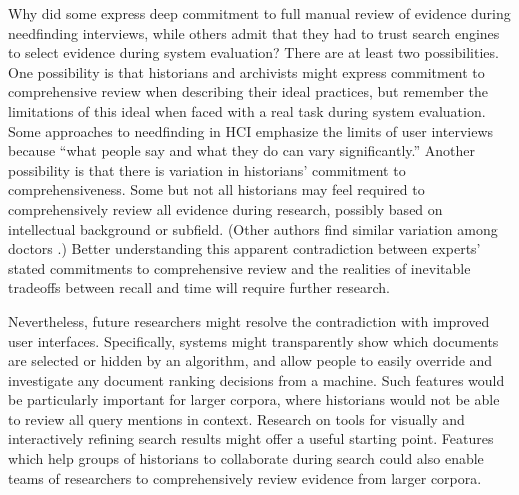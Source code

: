 Why did some express deep commitment to full manual review of evidence during needfinding interviews, while others admit that they had to trust search engines to select evidence during system evaluation? 
There are at least two possibilities. 
One possibility is that historians and archivists might express commitment to comprehensive review when describing their ideal practices, but remember the limitations of this ideal when faced with a real task during system evaluation.
Some approaches to needfinding in HCI emphasize the limits of user interviews \cite{ethographic} because ``what people say and what they do can vary significantly.''
Another possibility is that there is variation in historians' commitment to comprehensiveness.
Some but not all historians may feel required to comprehensively review all evidence during research, possibly based on intellectual background or subfield.
(Other authors find similar variation among doctors \cite[Sec.\ 4.3.5]{doccurate}.)
Better understanding this apparent contradiction  between experts' stated commitments to comprehensive review and the realities of inevitable tradeoffs between recall and time \cite[Fig.\ 6]{pirolli2005sensemaking}  will require further research.

Nevertheless, future researchers might resolve the contradiction with improved user interfaces. 
Specifically, systems might transparently show which documents are selected or hidden by an algorithm, and allow people to easily override and investigate any document ranking decisions from a machine.
Such features would be particularly important for larger corpora, where historians would not be able to review all query mentions in context.
Research on tools for visually and interactively refining search results \cite{TiisVizIR} might offer a useful starting point.
Features which help groups of historians to collaborate during search could also enable teams of researchers to comprehensively review evidence from larger corpora.
